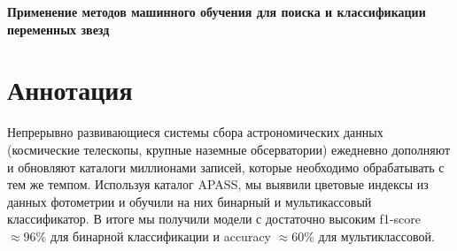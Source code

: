 \documentclass[11pt, a4paper]{article}
\begin{document}
\thispagestyle{firstpage}

\noindent
\hspace*{0.5cm}
\begin{minipage}{0.8\textwidth}
\LARGE \textbf{Применение методов машинного обучения для поиска и классификации переменных звезд}
\end{minipage}\vspace{20pt}

\hspace{0.2\textwidth}\begin{minipage}{0.7\textwidth}
\section*{Аннотация}
Непрерывно развивающиеся системы сбора астрономических данных (космические телескопы, крупные наземные обсерватории) ежедневно дополняют и обновляют каталоги миллионами записей, которые необходимо обрабатывать с тем же темпом. Используя каталог APASS, мы выявили цветовые индексы из данных фотометрии и обучили на них бинарный и мультикассовый классификатор. В итоге мы получили модели с достаточно высоким f1-score $\approx 96\%$ для бинарной классификации и accuracy $\approx 60\%$ для мультиклассовой.
\end{minipage}
\end{document}
